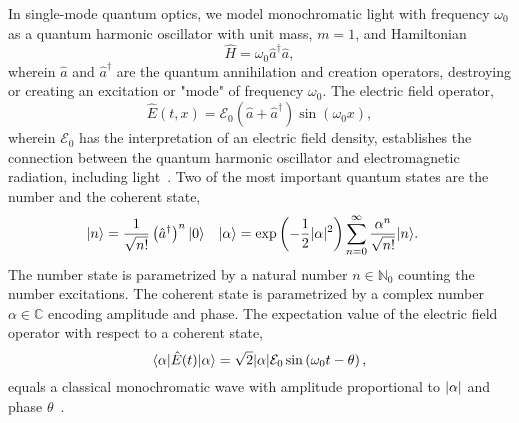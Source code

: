 In single-mode quantum optics, we model monochromatic light with frequency $\omega_0$ as a quantum harmonic oscillator with unit mass, $m=1$, and Hamiltonian~\cite{Gerry2005,Fox2006}
\begin{equation}
	\hat{H}
	=
	\omega_0
	\hat{a}^\dagger
	\hat{a}
	,
\end{equation}
wherein $\hat{a}$ and $\hat{a}^\dagger$ are the quantum annihilation and creation operators, destroying or creating an excitation or "mode" of frequency $\omega_0$.
The electric field operator,
\begin{equation}
	\hat{E}(t,x)
	=
	\mathcal{E}_0
	\left(
		\hat{a}
		+
		\hat{a}^\dagger
	\right)
	\sin(\omega_0x)
	,
\end{equation}
wherein $\mathcal{E}_0$ has the interpretation of an electric field density, establishes the connection between the quantum harmonic oscillator and electromagnetic radiation, including light~\cite[p.~12]{Gerry2005}.
Two of the most important quantum states are the number and the coherent state,
\begin{align}
	\lvert n\rangle
	&=
	\frac{1}{\sqrt{n!}}
	\left(\hat{a}^\dagger\right)^n
	\lvert0\rangle
	&
	\lvert\alpha\rangle
	&=
	\exp\left(-\frac{1}{2}\lvert\alpha\rvert^2\right)
	\sum_{n=0}^\infty
	\frac{\alpha^n}{\sqrt{n!}}
	\lvert n\rangle
	.
\end{align}
The number state is parametrized by a natural number $n\in\mathbb{N}_0$ counting the number excitations.
The coherent state is parametrized by a complex number $\alpha\in\mathbb{C}$ encoding amplitude and phase.
The expectation value of the electric field operator with respect to a coherent state,
\begin{equation}
	\langle\alpha\rvert
	\hat{E}(t)
	\lvert\alpha\rangle
	=
	\sqrt{2}
	\lvert\alpha\rvert
	\mathcal{E}_0
	\sin\left(\omega_0t-\theta\right)
	,
\end{equation}
equals a classical monochromatic wave with amplitude proportional to $\lvert\alpha\rvert$ and phase $\theta$~\cite[p.~45]{Gerry2005}.

